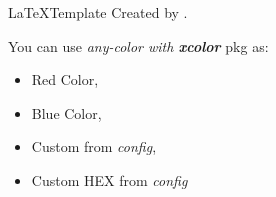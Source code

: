 \documentclass[11pt, a4paper, twoside, singlespacing]{report} %
\begin{document}
	\vspace*{\fill}
	\begin{center}
		\LaTeX Template Created by \AuthorName. \\[21pt]
	\end{center}
	You can use \textit{any-color with \textbf{xcolor}} pkg as:
	\begin{itemize}
		\item {\color{red} Red Color},
		\item {\color{blue} Blue Color},
		\item \textcolor{semi-gray}{Custom from \textit{config}},
		\item \textcolor{custom-hex}{Custom HEX from \textit{config}}
	\end{itemize}
	\vspace*{\fill}
		
\end{document}
